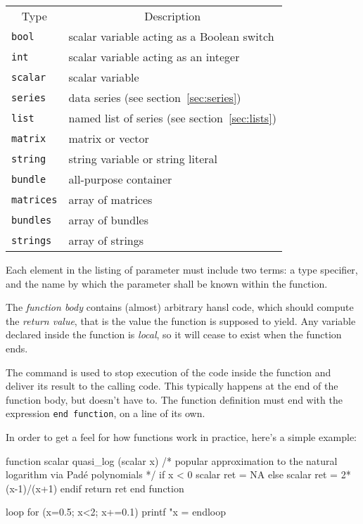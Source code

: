 \begin{center}
\begin{tabular}{ll}
  \multicolumn{1}{c}{Type} & 
  \multicolumn{1}{c}{Description} \\ [4pt]
  \texttt{bool}   & scalar variable acting as a Boolean switch \\
  \texttt{int}    & scalar variable acting as an integer  \\
  \texttt{scalar} & scalar variable \\
  \texttt{series} & data series (see section~\ref{sec:series})\\
  \texttt{list}   & named list of series  (see section~\ref{sec:lists})\\
  \texttt{matrix} & matrix or vector \\
  \texttt{string} & string variable or string literal \\
  \texttt{bundle} & all-purpose container \\
  \texttt{matrices} & array of matrices \\
  \texttt{bundles}  & array of bundles \\
  \texttt{strings}  & array of strings
\end{tabular}
\end{center}

Each element in the listing of parameter must include two terms: a
type specifier, and the name by which the parameter shall be known
within the function.

The \emph{function body} contains (almost) arbitrary hansl code, which
should compute the \emph{return value}, that is the value the function
is supposed to yield. Any variable declared inside the function is
\emph{local}, so it will cease to exist when the function ends.

The  command is used to stop execution of the code inside
the function and deliver its result to the calling code. This
typically happens at the end of the function body, but doesn't have
to. The function definition must end with the expression
\verb|end function|, on a line of its own.


In order to get a feel for how functions work in practice, here's a
simple example:
\begin{code}
function scalar quasi_log (scalar x)
   /* popular approximation to the natural logarithm
     via Padé polynomials 
   */
   if x < 0
      scalar ret = NA
   else 
      scalar ret = 2*(x-1)/(x+1)
   endif
   return ret
end function

loop for (x=0.5; x<2; x+=0.1)
   printf "x = %
endloop
\end{code}


